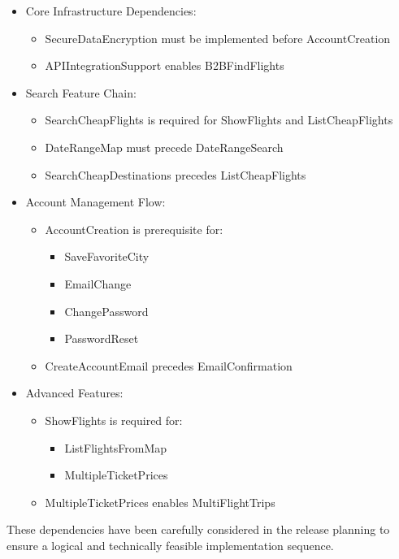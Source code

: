 \begin{itemize}
\item Core Infrastructure Dependencies:
  \begin{itemize}
  \item SecureDataEncryption must be implemented before AccountCreation
  \item APIIntegrationSupport enables B2BFindFlights
  \end{itemize}

\item Search Feature Chain:
  \begin{itemize}
  \item SearchCheapFlights is required for ShowFlights and ListCheapFlights
  \item DateRangeMap must precede DateRangeSearch
  \item SearchCheapDestinations precedes ListCheapFlights
  \end{itemize}

\item Account Management Flow:
  \begin{itemize}
  \item AccountCreation is prerequisite for:
    \begin{itemize}
    \item SaveFavoriteCity
    \item EmailChange
    \item ChangePassword
    \item PasswordReset
    \end{itemize}
  \item CreateAccountEmail precedes EmailConfirmation
  \end{itemize}

\item Advanced Features:
  \begin{itemize}
  \item ShowFlights is required for:
    \begin{itemize}
    \item ListFlightsFromMap
    \item MultipleTicketPrices
    \end{itemize}
  \item MultipleTicketPrices enables MultiFlightTrips
  \end{itemize}
\end{itemize}

These dependencies have been carefully considered in the release planning to ensure a logical and technically feasible implementation sequence.

